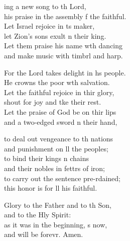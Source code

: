 \settowidth{\versewidth}{his praise in the assembly of the faithful.}
\begin{psalmverse}%
  \begin{patverse}
    ing a new song to th Lord,\Med\\
his praise in the assembly f the faithful.\\
Let Israel rejoice in \pointup{\i}ts maker,\Med\\
let Zion’s sons exult n their king.\\
Let them praise his name w\pointup{\i}th dancing\Med\\
and make music with timbrl and harp.

For the Lord takes delight in h\pointup{\i}s people.\Med\\
He crowns the poor wth salvation.\\
Let the faithful rejoice in thir glory,\Med\\
shout for joy and tke their rest.\\
Let the praise of God be on thir lips\Med\\
and a two-edged sword n their hand,

to deal out vengeance to th nations\Med\\
and punishment on ll the peoples;\\
to bind their kings \pointup{\i}n chains\Med\\
and their nobles in fettrs of iron;\\
to carry out the sentence pre-rdained;\Med\\
this honor is for ll his faithful.

Glory to the Father and to th Son,\Med\\
and to the Hly Spirit:\\
as it was in the beginning, \pointup{\i}s now,\Med\\
and will be forevr. Amen.
  \end{patverse}
\end{psalmverse}
